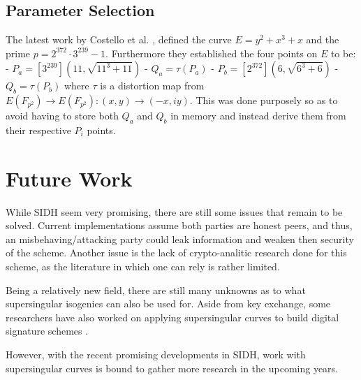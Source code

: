 \documentclass[10pt,twocolumn]{article} %
\begin{document}
\subsection{Parameter Selection}
\label{sec:params}
The latest work by Costello et al. \cite{costello2016}, defined the curve $E = y^2+x^3 +x$ and the prime $p = 2^{372}\cdot 3^{239}-1$. Furthermore they established the four points on $E$ to be:
- $P_{a} = [3^{239}](11,\sqrt{11^3+11})$ \newline
- $Q_a=\tau(P_a)$ \newline
- $P_b=[2^{372}](6,\sqrt{6^3+6})$ \newline
- $Q_b=\tau(P_b)$ \newline
where $\tau$ is a distortion map from $E(F_{p^2})\rightarrow E(F_{p^2}) : (x,y) \rightarrow (-x,iy)$. This was done purposely so as to avoid having to store both $Q_a$ and $Q_b$ in memory and instead derive them from their respective $P_i$ points.

\section{Future Work}
While SIDH seem very promising, there are still some issues that remain to be solved. Current implementations assume both parties are honest peers, and thus, an misbehaving/attacking party could leak information and weaken then security of the scheme. Another issue is the lack of crypto-analitic research done for this scheme, as the literature in which one can rely is rather limited.
\par Being a relatively new field, there are still many unknowns as to what supersingular isogenies can also be used for. Aside from key exchange, some researchers have also worked on applying supersingular curves to build digital signature schemes \cite{jao2014isogeny,sun2014toward}. 
\par However, with the recent promising developments in SIDH, work with supersingular curves is bound to gather more research in the upcoming years. 





\end{document}
